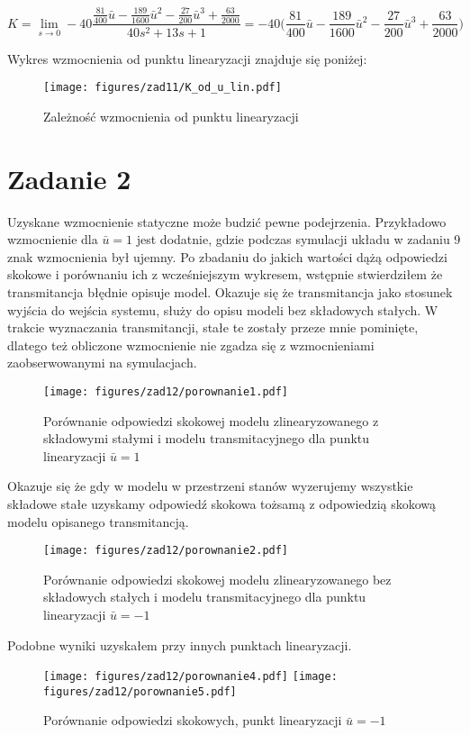 \documentclass[a4paper,titlepage,11pt,floatssmall]{mwrep}
\begin{document}
$$
K = \lim_{s\to 0} -40\frac{\frac{81}{400}\bar{u} - \frac{189}{1600}\bar{u}^2 - \frac{27}{200}\bar{u}^3 + \frac{63}{2000}}{40s^2 + 13s + 1} = -40\bigg(\frac{81}{400}\bar{u} - \frac{189}{1600}\bar{u}^2 - \frac{27}{200}\bar{u}^3 + \frac{63}{2000}\bigg)
$$

Wykres wzmocnienia od punktu linearyzacji znajduje się poniżej:

\begin{figure}[H]
\centering
\texttt{[image: figures/zad11/K\_od\_u\_lin.pdf]}
\caption{Zależność wzmocnienia od punktu linearyzacji}
\end{figure}

\newpage

\section{Zadanie 2}
\indent{} Uzyskane wzmocnienie statyczne może budzić pewne podejrzenia. Przykładowo wzmocnienie dla $\bar{u} = 1$ jest dodatnie, gdzie podczas symulacji układu w zadaniu 9 znak wzmocnienia był ujemny. Po zbadaniu do jakich wartości dążą odpowiedzi skokowe i porównaniu ich z wcześniejszym wykresem, wstępnie stwierdziłem że transmitancja błędnie opisuje model. Okazuje się że transmitancja jako stosunek wyjścia do wejścia systemu, służy do opisu modeli bez składowych stałych. W trakcie wyznaczania transmitancji, stałe te zostały przeze mnie pominięte, dlatego też obliczone wzmocnienie nie zgadza się z wzmocnieniami zaobserwowanymi na symulacjach. 

\begin{figure}[H]
\centering
\texttt{[image: figures/zad12/porownanie1.pdf]}
\caption{Porównanie odpowiedzi skokowej modelu zlinearyzowanego z składowymi stałymi i modelu transmitacyjnego dla punktu linearyzacji $\bar{u} = 1$}
\end{figure}
\newpage 
Okazuje się że gdy w modelu w przestrzeni stanów wyzerujemy wszystkie składowe stałe uzyskamy odpowiedź skokowa tożsamą z odpowiedzią skokową modelu opisanego transmitancją. 

\begin{figure}[H]
\centering
\texttt{[image: figures/zad12/porownanie2.pdf]}
\caption{Porównanie odpowiedzi skokowej modelu zlinearyzowanego bez składowych stałych i modelu transmitacyjnego dla punktu linearyzacji $\bar{u} = -1$}
\end{figure}
\newpage

Podobne wyniki uzyskałem przy innych punktach linearyzacji.
\begin{figure}[H]
\centering
\texttt{[image: figures/zad12/porownanie4.pdf]}
\quad
\texttt{[image: figures/zad12/porownanie5.pdf]}
\caption{Porównanie odpowiedzi skokowych, punkt linearyzacji $\bar{u} = -1$} 
\end{figure}
\newpage
\end{document}
